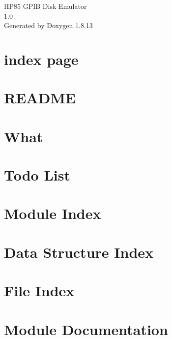 \documentclass[twoside]{book}
\newcommand{\+}{\discretionary{\mbox{\scriptsize$\hookleftarrow$}}{}{}}
\newcommand{\clearemptydoublepage}{%
  \newpage{\pagestyle{empty}\cleardoublepage}%
}
\begin{document}
\hypersetup{pageanchor=false,
             bookmarksnumbered=true,
             pdfencoding=unicode
            }
\begin{titlepage}
\vspace*{7cm}
\begin{center}%
{\Large H\+P85 G\+P\+IB Disk Emulator \\[1ex]\large 1.\+0 }\\
\vspace*{1cm}
{\large Generated by Doxygen 1.8.13}\\
\end{center}
\end{titlepage}
\clearemptydoublepage
{}
\tableofcontents
\clearemptydoublepage
{}
\hypersetup{pageanchor=true}

\chapter{index page}
\label{index}\hypertarget{index}{}
\chapter{R\+E\+A\+D\+ME}
\label{md_README}

\chapter{What}
\label{md_lif_README}

\chapter{Todo List}
\label{todo}

\chapter{Module Index}

\chapter{Data Structure Index}

\chapter{File Index}

\chapter{Module Documentation}

\end{document}
